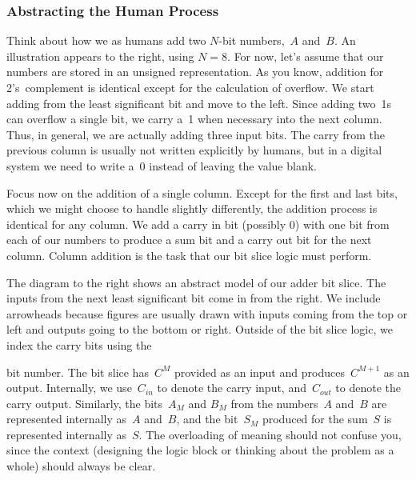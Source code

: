 \subsubsection{Abstracting the Human Process}

\begin{minipage}{4.25in}
Think about how we as humans add two \mbox{$N$-bit}
numbers,~$A$ and~$B$.
%
An illustration appears to the right, using $N=8$.
%
For now, let's assume that our numbers are stored in an unsigned 
representation.
%
As you know, addition for 2's~complement is identical except for the
calculation of overflow.
%
We start adding from the least significant bit and move to the left.
Since adding two~1s can overflow a single bit, we carry a~1 when
necessary into the next column.  Thus, in general, we are actually
adding three input bits.  The carry from the previous column is usually
not written explicitly by humans, but in a digital system
we need to write a~0 instead of leaving the value blank.\mpline

Focus now on the addition of a single column.  Except for the
first and last bits, which we might choose to handle slightly 
differently, the addition process is identical 
for any column.  We add a carry in bit (possibly 0) with one
bit from each of our numbers to produce a sum bit and a carry
out bit for the next column.  Column addition is the task
that our bit slice logic must perform.\mpline

The diagram to the right shows an abstract model of our 
adder bit slice.  The inputs from the next least significant
bit come in from the right.  We include arrowheads because 
figures are usually drawn with inputs coming
from the top or left 
and outputs going to the bottom or right.  Outside
of the bit slice logic, we index the carry bits using the\linebreak
\end{minipage}\hspace{.25in}%
\begin{minipage}{2in}
\vspace{40pt}
\centerline{}
\end{minipage}\mpdone

\pagebreak

bit number.  The bit slice has~$C^M$ provided as an input and 
produces~$C^{M+1}$ as an output.
%
Internally, we use~$C_{in}$ to denote the carry input,
and~$C_{out}$ to denote the carry output.
%
Similarly, the
bits~$A_M$ and $B_M$ from the numbers~$A$ and~$B$ are
represented internally as~$A$ and~$B$, and the bit~$S_M$ produced for
the sum~$S$ is represented internally as~$S$.  The overloading of
meaning should not confuse you, since the context (designing the
logic block or thinking about the problem as a whole) should always
be clear.


